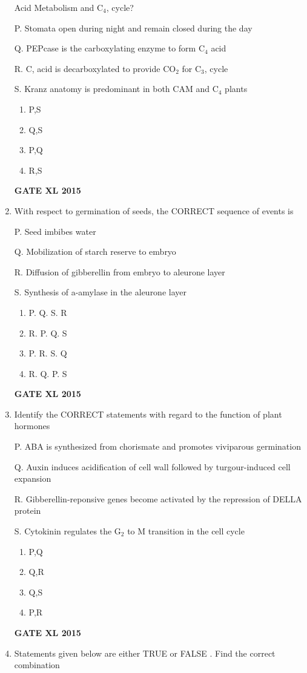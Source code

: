\documentclass[journal,12pt,onecolumn]{IEEEtran}
\begin{document}
\begin{enumerate}
Acid Metabolism  and C$_4$, cycle?

P. Stomata open during night and remain closed during the day

Q. PEPcase is the carboxylating enzyme to form C$_4$ acid

R. C, acid is decarboxylated to provide CO$_2$ for C$_3$, cycle

S. Kranz anatomy is predominant in both CAM and C$_4$ plants
    \begin{enumerate}
            \item P,S
	    \item Q,S
	    \item P,Q
            \item R,S
    \end{enumerate}
\hfill{\textbf{GATE XL 2015}}
\item With respect to germination of seeds, the CORRECT sequence of events is

P. Seed imbibes water

Q. Mobilization of starch reserve to embryo

R. Diffusion of gibberellin from embryo to aleurone layer

S. Synthesis of a-amylase in the aleurone layer
    \begin{enumerate}
            \item P. Q. S. R
	    \item R. P. Q. S
	    \item P. R. S. Q
            \item R. Q. P. S
    \end{enumerate}
\hfill{\textbf{GATE XL 2015}}
\item 
Identify the CORRECT statements with regard to the function of plant hormones

P. ABA is synthesized from chorismate and promotes viviparous germination

Q. Auxin induces acidification of cell wall followed by turgour-induced cell expansion

R. Gibberellin-reponsive genes become activated by the repression of DELLA protein

S. Cytokinin regulates the G$_2$ to M transition in the cell cycle
    \begin{enumerate}
            \item P,Q
	    \item Q,R
	    \item Q,S
            \item P,R
    \end{enumerate}
\hfill{\textbf{GATE XL 2015}}
\item Statements given below are either TRUE  or FALSE . Find the correct combination


\end{enumerate}
\end{document}
